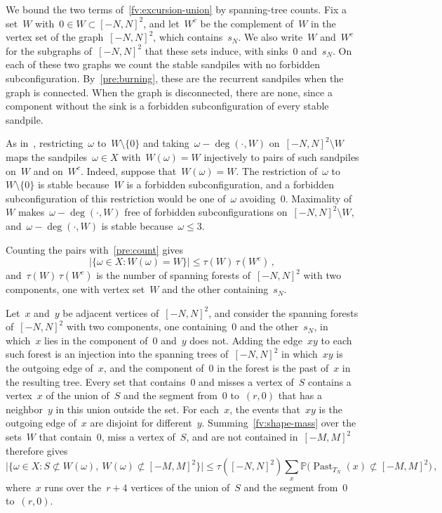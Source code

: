 \documentclass[11pt]{amsart}
\numberwithin{equation}{section}
\newcommand{\PP}{\mathbb P}
\begin{document}
We bound the two terms of~\eqref{fv:excursion-union} by spanning-tree counts. Fix a set~$W$ with~$0\in W\subset [-N,N]^2$, and let~$W^c$ be the complement of~$W$ in the vertex set of the graph~$[-N,N]^2$, which contains~$s_N$. We also write~$W$ and~$W^c$ for the subgraphs of~$[-N,N]^2$ that these sets induce, with sinks~$0$ and~$s_N$. On each of these two graphs we count the stable sandpiles with no forbidden subconfiguration. By~\eqref{pre:burning}, these are the recurrent sandpiles when the graph is connected. When the graph is disconnected, there are none, since a component without the sink is a forbidden subconfiguration of every stable sandpile.

As in~\citet[proof of Theorem~3]{JaraiWerning2014}, restricting~$\omega$ to~$W\setminus\{0\}$ and taking~$\omega-\deg(\cdot,W)$ on~$[-N,N]^2\setminus W$ maps the sandpiles~$\omega\in X$ with~$W(\omega)=W$ injectively to pairs of such sandpiles on~$W$ and on~$W^c$. Indeed, suppose that~$W(\omega)=W$. The restriction of~$\omega$ to~$W\setminus\{0\}$ is stable because~$W$ is a forbidden subconfiguration, and a forbidden subconfiguration of this restriction would be one of~$\omega$ avoiding~$0$. Maximality of~$W$ makes~$\omega-\deg(\cdot,W)$ free of forbidden subconfigurations on~$[-N,N]^2\setminus W$, and~$\omega-\deg(\cdot,W)$ is stable because~$\omega\leq3$.

Counting the pairs with~\eqref{pre:count} gives
\begin{equation}\label{fv:shape-mass}
 \bigl|\{\omega\in X:W(\omega)=W\}\bigr|\leq\tau(W)\,\tau(W^c)\,,
\end{equation}
and~$\tau(W)\,\tau(W^c)$ is the number of spanning forests of~$[-N,N]^2$ with two components, one with vertex set~$W$ and the other containing~$s_N$.

Let~$x$ and~$y$ be adjacent vertices of~$[-N,N]^2$, and consider the spanning forests of~$[-N,N]^2$ with two components, one containing~$0$ and the other~$s_N$, in which~$x$ lies in the component of~$0$ and~$y$ does not. Adding the edge~$xy$ to each such forest is an injection into the spanning trees of~$[-N,N]^2$ in which~$xy$ is the outgoing edge of~$x$, and the component of~$0$ in the forest is the past of~$x$ in the resulting tree. Every set that contains~$0$ and misses a vertex of~$S$ contains a vertex~$x$ of the union of~$S$ and the segment from~$0$ to~$(r,0)$ that has a neighbor~$y$ in this union outside the set. For each~$x$, the events that~$xy$ is the outgoing edge of~$x$ are disjoint for different~$y$. Summing~\eqref{fv:shape-mass} over the sets~$W$ that contain~$0$, miss a vertex of~$S$, and are not contained in~$[-M,M]^2$ therefore gives
\begin{equation}\label{fv:large-omission}
 \bigl|\{\omega\in X:S\not\subset W(\omega),\ W(\omega)\not\subset [-M,M]^2\}\bigr|
 \leq\tau([-N,N]^2)\sum_x\PP\bigl(\operatorname{Past}_{T_N}(x)\not\subset [-M,M]^2\bigr)\,,
\end{equation}
where~$x$ runs over the~$r+4$ vertices of the union of~$S$ and the segment from~$0$ to~$(r,0)$.
\end{document}
